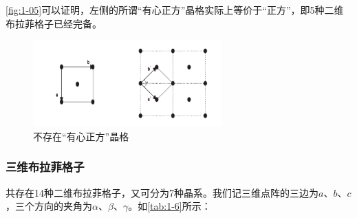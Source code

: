     \autoref{fig:1-05}可以证明，左侧的所谓“有心正方”晶格实际上等价于“正方”，即5种二维布拉菲格子已经完备。

    \begin{figure}[!htbp]
        \centering
        \includegraphics[height=9em, keepaspectratio=true]{pic/1-17}
        \caption{不存在“有心正方”晶格}
        \label{fig:1-05}
    \end{figure}

\subsubsection{三维布拉菲格子}
    共存在14种二维布拉菲格子，又可分为7种晶系。我们记三维点阵的三边为$a$、$b$、$c$，三个方向的夹角为$\alpha$、$\beta$、$\gamma$。如\autoref{tab:1-6}所示：

